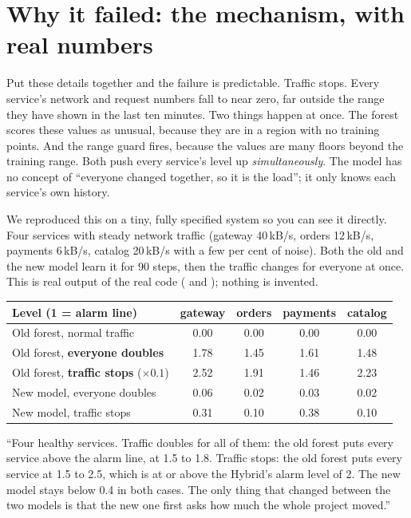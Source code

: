 \section{Why it failed: the mechanism, with real numbers}
\begin{simplebox}
Put these details together and the failure is predictable. Traffic stops. Every service's network and request numbers fall to near zero, far outside the range they have shown in the last ten minutes. Two things happen at once. The forest scores these values as unusual, because they are in a region with no training points. And the range guard fires, because the values are many floors beyond the training range. Both push every service's level up \emph{simultaneously}. The model has no concept of ``everyone changed together, so it is the load''; it only knows each service's own history.
\end{simplebox}

We reproduced this on a tiny, fully specified system so you can see it directly. Four services with steady network traffic (gateway 40\,kB/s, orders 12\,kB/s, payments 6\,kB/s, catalog 20\,kB/s with a few per cent of noise). Both the old and the new model learn it for 90 steps, then the traffic changes for everyone at once. This is real output of the real code ( and ); nothing is invented.

\begin{center}
\small
\begin{tabular}{lcccc}
\toprule
\textbf{Level (1 = alarm line)} & gateway & orders & payments & catalog\\
\midrule
Old forest, normal traffic & 0.00 & 0.00 & 0.00 & 0.00\\
Old forest, \textbf{everyone doubles} & 1.78 & 1.45 & 1.61 & 1.48\\
Old forest, \textbf{traffic stops} ($\times0.1$) & 2.52 & 1.91 & 1.46 & 2.23\\
\midrule
New model, everyone doubles & 0.06 & 0.02 & 0.03 & 0.02\\
New model, traffic stops & 0.31 & 0.10 & 0.38 & 0.10\\
\bottomrule
\end{tabular}
\end{center}

\begin{saybox}
``Four healthy services. Traffic doubles for all of them: the old forest puts every service above the alarm line, at 1.5 to 1.8. Traffic stops: the old forest puts every service at 1.5 to 2.5, which is at or above the Hybrid's alarm level of 2. The new model stays below 0.4 in both cases. The only thing that changed between the two models is that the new one first asks how much the whole project moved.''
\end{saybox}

